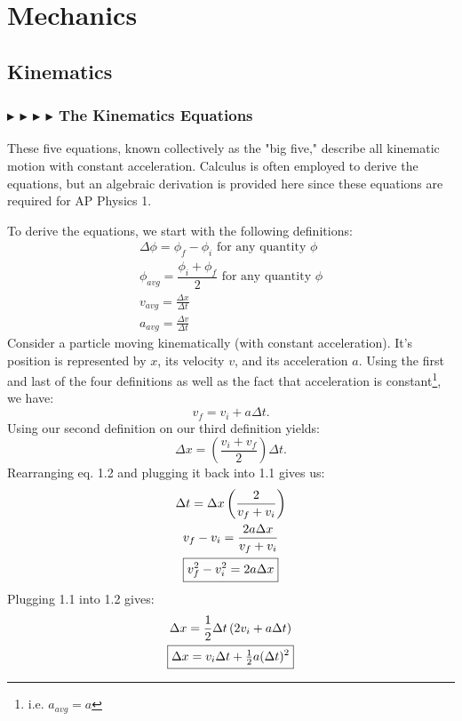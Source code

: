 \chapter{Mechanics}\label{cap2}


\section{Kinematics}
\subsection{\color{OrangeRed} $\blacktriangleright$ \color{PineGreen} $\blacktriangleright$ \color{Goldenrod} $\blacktriangleright$ \color{Orchid} $\blacktriangleright$ \color{black} The Kinematics Equations}
These five equations, known collectively as the "big five," describe all kinematic motion with constant acceleration. Calculus is often employed to derive the equations, but an algebraic derivation is provided here since these equations are required for AP Physics 1. 

\noindent To derive the equations, we start with the following definitions:
\begin{gather*}
\Delta \phi = \phi_f - \phi_i \text{ for any quantity } \phi \\
\phi_{avg} = \dfrac{\phi_i + \phi_f}{2} \text{ for any quantity }\phi \\
v_{avg} = \frac{\Delta x}{\Delta t} \\
a_{avg} = \frac{\Delta v}{\Delta t} 
\end{gather*}
\noindent Consider a particle moving kinematically (with constant acceleration). It's position is represented by $x$, its velocity $v$, and its acceleration $a$. Using the first and last of the four definitions as well as the fact that acceleration is constant\footnote{i.e. $a_{avg} = a$}, we have:
\begin{equation}
\boxed{v_f = v_i + a\Delta t}.
\end{equation}
\noindent Using our second definition on our third definition yields:
\begin{equation}
\boxed{\Delta x = \left( \dfrac{v_i + v_f}{2}\right) \Delta t}.
\end{equation}
\noindent Rearranging eq. 1.2 and plugging it back into 1.1 gives us:
\begin{gather}
\Delta t = \Delta x \left(\dfrac{2}{v_f + v_i}\right) \nonumber \\
v_f - v_i = \dfrac{2a\Delta x}{v_f + v_i} \nonumber \\
\boxed{v_f^2 - v_i^2 = 2a\Delta x}
\end{gather}
\clearpage
\noindent Plugging 1.1 into 1.2 gives:
\begin{gather}
\Delta x = \frac12 \Delta t \left( 2v_i + a\Delta t\right) \nonumber \\
\boxed{\Delta x = v_i\Delta t + \tfrac12 a (\Delta t)^2}
\end{gather}

